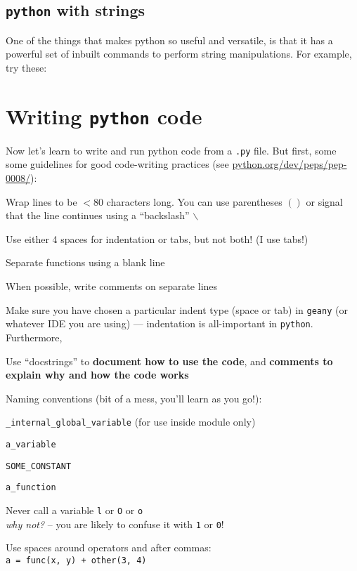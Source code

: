 \subsection{{\tt python} with strings}

One of the things that makes python so useful and versatile, is that it 
has a powerful set of inbuilt commands to perform string manipulations. 
For example, try these: 



\section{Writing {\tt python} code}

Now let's learn to write and run python code from a {\tt *.py} file. 
But first, some some guidelines for good code-writing practices (see
\url{python.org/dev/peps/pep-0008/}):
  \begin{compactitem} \itemsep8pt
    \item Wrap lines to be $<$80 characters long. You can use parentheses $()$
  or signal that the line continues using a ``backslash'' $\backslash$
    \item Use either 4 spaces for indentation or tabs, but not both! (I use tabs!)
    \item Separate functions using a blank line
    \item When possible, write comments on separate lines
  \end{compactitem}

Make sure you have chosen a particular indent type (space or tab) in 
{\tt geany} (or whatever IDE you are using) --- indentation is all-important 
in {\tt python}. Furthermore, 
\begin{compactitem} \itemsep4pt
    \item Use ``docstrings'' to {\bf document how to use the code}, and
      {\bf comments to explain why and how the code works}
    \item Naming conventions (bit of a mess, you'll learn as you go!):
    \begin{compactitem}
      \item {\tt \_internal\_global\_variable} (for use inside module only)
      \item {\tt a\_variable}
      \item {\tt SOME\_CONSTANT}
      \item {\tt a\_function}
			\item Never call a variable {\tt l} or {\tt O} or {\tt o}\\ {\it 
			why not?} -- you are likely to confuse it with {\tt 1} or {\tt 0}!
    \end{compactitem}
	\item Use spaces around operators and after commas:\\ 
  {\tt  a = func(x, y) + other(3, 4)} 
\end{compactitem}

